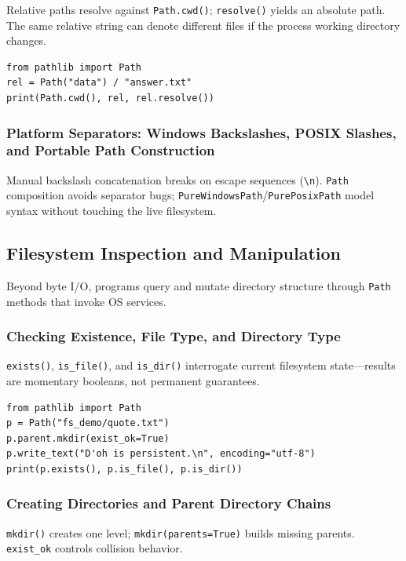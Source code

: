 \documentclass[a4paper,twoside]{report}
\begin{document}
Relative paths resolve against \texttt{Path.cwd()}; \texttt{resolve()} yields an absolute path. The same relative string can denote different files if the process working directory changes.

\begin{verbatim}
from pathlib import Path
rel = Path("data") / "answer.txt"
print(Path.cwd(), rel, rel.resolve())
\end{verbatim}

\subsubsection{Platform Separators: Windows Backslashes, POSIX Slashes, and Portable Path Construction}

Manual backslash concatenation breaks on escape sequences (\texttt{\textbackslash n}). \texttt{Path} composition avoids separator bugs; \texttt{PureWindowsPath}/\texttt{PurePosixPath} model syntax without touching the live filesystem.


\subsection{Filesystem Inspection and Manipulation}

Beyond byte I/O, programs query and mutate directory structure through \texttt{Path} methods that invoke OS services.

\subsubsection{Checking Existence, File Type, and Directory Type}

\texttt{exists()}, \texttt{is\_file()}, and \texttt{is\_dir()} interrogate current filesystem state---results are momentary booleans, not permanent guarantees.

\begin{verbatim}
from pathlib import Path
p = Path("fs_demo/quote.txt")
p.parent.mkdir(exist_ok=True)
p.write_text("D'oh is persistent.\n", encoding="utf-8")
print(p.exists(), p.is_file(), p.is_dir())
\end{verbatim}

\subsubsection{Creating Directories and Parent Directory Chains}

\texttt{mkdir()} creates one level; \texttt{mkdir(parents=True)} builds missing parents. \texttt{exist\_ok} controls collision behavior.
\end{document}
